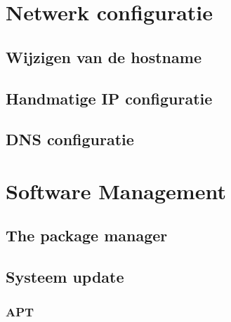 \documentclass[a4paper,12pt,twoside,openright,titlepage]{book}
\begin{document}
\chapter{Netwerk configuratie}

\section{Wijzigen van de hostname}

\section{Handmatige IP configuratie}





\section{DNS configuratie}

%

\chapter{Software Management}

\section{The package manager}

\section{Systeem update}

\subsection{APT}

\end{document}
